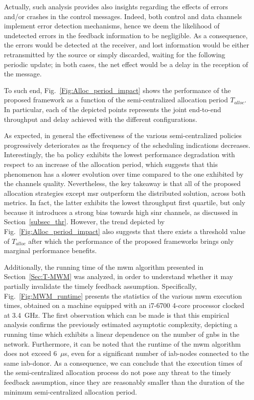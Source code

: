 Actually, such analysis provides also insights regarding the effects of errors and/or crashes in the control messages. Indeed, both control and data channels implement error detection mechanisms, hence we deem the likelihood of undetected errors in the feedback information to be negligible. As a consequence, the errors would be detected at the receiver, and lost information would be either retransmitted by the source or simply discarded, waiting for the following periodic update; in both cases, the net effect would be a delay in the reception of the message.

To such end, Fig.~\ref{Fig:Alloc_period_impact} shows the performance of the proposed framework as a function of the semi-centralized allocation period $T_{alloc}$. In particular, each of the depicted points represents the joint end-to-end throughput and delay achieved with the different configurations.

As expected, in general the effectiveness of the various semi-centralized policies progressively deteriorates as the frequency of the scheduling indications decreases. Interestingly, the \gls{ba} policy exhibits the lowest performance degradation with respect to an increase of the allocation period, which suggests that this phenomenon has a slower evolution over time compared to the one exhibited by the channels quality. Nevertheless, the key takeaway is that all of the proposed allocation strategies except \gls{msr} outperform the distributed solution, across both metrics. In fact, the latter exhibits the lowest throughput first quartile, but only because it introduces a strong bias towards high \gls{sinr} channels, as discussed in Section~\ref{subsec_thr}. However, the trend depicted by Fig.~\ref{Fig:Alloc_period_impact} also suggests that there exists a threshold value of $T_{alloc}$ after which the performance of the proposed frameworks brings only marginal performance benefits.

Additionally, the running time of the \gls{mwm} algorithm presented in Section~\ref{Sec:T-MWM} was analyzed, in order to understand whether it may partially invalidate the timely feedback assumption. Specifically, Fig.~\ref{Fig:MWM_runtime} presents the statistics of the various \gls{mwm} execution times, obtained on a machine equipped with an i7-6700 4-core processor clocked at 3.4~{GHz}. 
The first observation which can be made is that this empirical analysis confirms the previously estimated asymptotic complexity, depicting a running time which exhibits a linear dependence on the number of \glspl{gnb} in the network. Furthermore, it can be noted that the runtime of the \gls{mwm} algorithm does not exceed 6~$\mu$s, even for a significant number of \gls{iab}-nodes connected to the same \gls{iab}-donor. As a consequence, we can conclude that the execution times of the semi-centralized allocation process do not pose any threat to the timely feedback assumption, since they are reasonably smaller than the duration of the minimum semi-centralized allocation period. 

